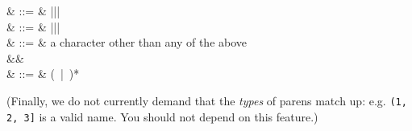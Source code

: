 \begin{grammar}
    & ::= &  \term{(}\cfgsp |\cfgsp \term{\{}\cfgsp |\cfgsp \term{[}\cfgsp |\cfgsp \term{$<$} \\
   & ::= &  \term{)}\cfgsp |\cfgsp \term{\}}\cfgsp |\cfgsp \term{]}\cfgsp |\cfgsp \term{$>$} \\
   & ::= &  \textrm{a character other than any of the above} \\
&& \\
  & ::= &  \cfgsp  (\ |\ )*\cfgsp  {}
\end{grammar}

(Finally, we do not currently demand that the \textsl{types} of parens
  match up: e.g. \texttt{(1, 2, 3]} is a valid name. You should not
    depend on this feature.)
